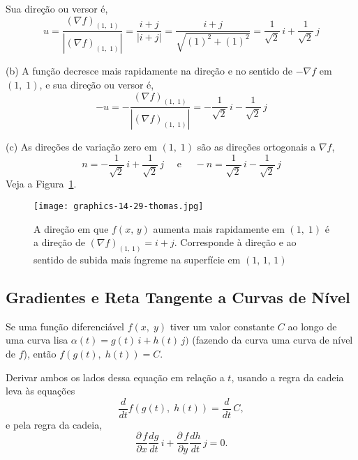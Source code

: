 Sua direção ou versor é,
\begin{equation*}
	u=\dfrac{(\nabla f)_{(1,\; 1)}}{|(\nabla f)_{(1,\; 1)}|} =\dfrac{i+j}{|i+j|}=\dfrac{i+j}{\sqrt{(1)^{2}+(1)^{2}}}=\frac{1}{\sqrt{2}}\, i + \frac{1}{\sqrt{2}}\, j
\end{equation*}

(b) A função decresce mais rapidamente na direção e no sentido de \(-\nabla f\) em \((1,\; 1)\), e sua direção ou versor é,
\begin{equation*}
	-u =-\dfrac{(\nabla f)_{(1,\; 1)}}{|(\nabla f)_{(1,\; 1)}|} =-\frac{1}{\sqrt{2}}\, i - \frac{1}{\sqrt{2}}\, j
\end{equation*}

(c) As direções de variação zero em \((1,\; 1)\) são as direções ortogonais a \(\nabla f\),
\begin{equation*}
	n=-\frac{1}{\sqrt{2}}\, i + \frac{1}{\sqrt{2}}\, j \quad \text{ e }\quad -n=\frac{1}{\sqrt{2}}\, i - \frac{1}{\sqrt{2}}\, j
\end{equation*}
Veja a Figura~\ref{fig:14-29-thomas}.

\begin{figure}[!h]
	\centering
	\texttt{[image: graphics-14-29-thomas.jpg]}
	\caption{A direção em que $f(x,\, y)$ aumenta mais rapidamente em \((1,\; 1)\) é
		a direção de \((\nabla f)_{(1,\, 1)}=i+j\). Corresponde à direção e ao sentido de subida mais íngreme na superfície em \((1,\, 1,\, 1)\)}
	\label{fig:14-29-thomas}
\end{figure}



%
\subsection*{Gradientes e Reta Tangente a Curvas de Nível}
%

Se uma função diferenciável \(f(x,\; y)\) tiver um valor constante \(C\) ao longo de uma curva lisa
\(\alpha(t) = g(t)\,i + h(t)\, j)\) (fazendo da curva uma curva de nível de \(f\)), então \(f(g(t),\; h(t))=C\).

Derivar ambos os lados dessa equação em relação a \(t\), usando a regra da cadeia leva às equações
\begin{equation*}
	\frac{d}{dt}f(g(t),\; h(t))  =\frac{d}{dt}\, C,
\end{equation*}
e pela regra da cadeia,
\begin{equation*}
	\frac{\partial\, f}{\partial x}\frac{dg}{dt}\, i + \frac{\partial\, f}{\partial y}\frac{dh}{dt}\, j  = 0.
\end{equation*}

